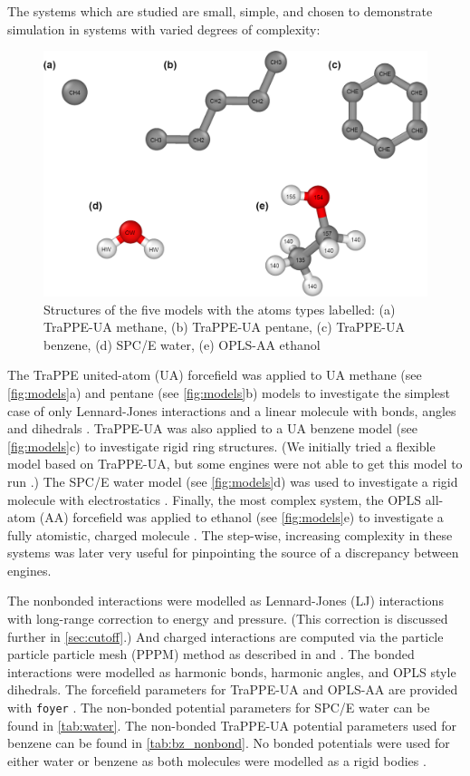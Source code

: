 The systems which are studied are small, simple, and chosen to demonstrate simulation in systems with varied degrees of complexity:
\begin{figure}[h!]
    \centering
    \includegraphics[width=\linewidth]{figures/rep_study/models.png}
    \caption{Structures of the five models with the atoms types labelled: (a) TraPPE-UA methane, (b) TraPPE-UA pentane, (c) TraPPE-UA benzene, (d) SPC/E water, (e) OPLS-AA ethanol}\label{fig:models}
\end{figure}
The TraPPE united-atom (UA) forcefield was applied to UA methane (see \autoref{fig:models}a) and pentane (see \autoref{fig:models}b) models to investigate the simplest case of only Lennard-Jones interactions and a linear molecule with bonds, angles and dihedrals \citep{Martin1998}.
TraPPE-UA was also applied to a UA benzene model (see \autoref{fig:models}c) to investigate rigid ring structures.
(We initially tried a flexible model based on TraPPE-UA, but some engines were not able to get this model to run \citep{Yiannourakou2019}.)
The SPC/E water model (see \autoref{fig:models}d) was used to investigate a rigid molecule with electrostatics \citep{Berendsen1987a}.
Finally, the most complex system, the OPLS all-atom (AA) forcefield was applied to ethanol (see \autoref{fig:models}e) to investigate a fully atomistic, charged molecule \citep{Jorgensen1988}.
The step-wise, increasing complexity in these systems was later very useful for pinpointing the source of a discrepancy between engines.

The nonbonded interactions were modelled as Lennard-Jones (LJ) interactions with long-range correction to energy and pressure. (This correction is discussed further in \autoref{sec:cutoff}.)
And charged interactions are computed via the particle particle particle mesh (PPPM) method as described in \citet{Darden1993} and \citet{Lebard2012}. 
The bonded interactions were modelled as harmonic bonds, harmonic angles, and OPLS style dihedrals.
The forcefield parameters for TraPPE-UA and OPLS-AA are provided with \texttt{foyer} \citep{foyer}. 
The non-bonded potential parameters for SPC/E water can be found in \autoref{tab:water}. 
The non-bonded TraPPE-UA potential parameters used for benzene can be found in \autoref{tab:bz_nonbond}. No bonded potentials were used for either water or benzene as both molecules were modelled as a rigid bodies \citep{Nguyen2011a, Glaser2020a}. 

